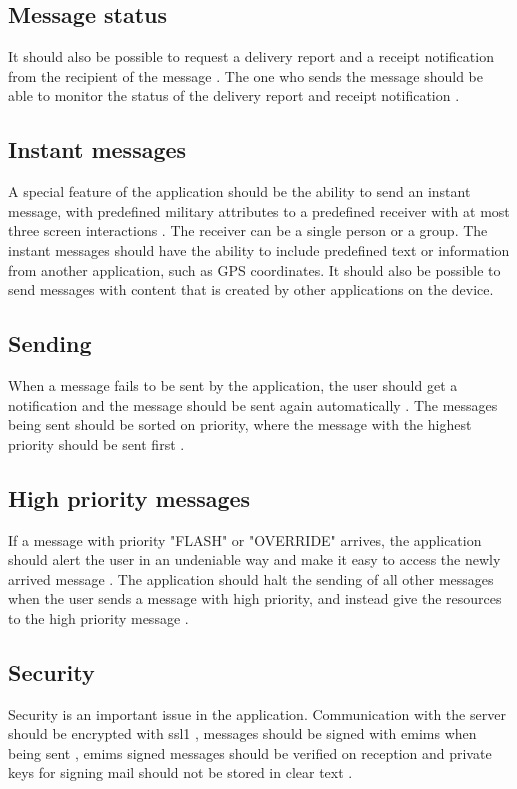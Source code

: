 \subsection{Message status}
It should also be possible to request a delivery report and a receipt notification from the recipient of the message . The one who sends the message should be able to monitor the status of the delivery report and receipt notification .

\subsection{Instant messages}
A special feature of the application should be the ability to send an instant message, with predefined military attributes to a predefined receiver with at most three screen interactions . The receiver can be a single person or a group. The instant messages should have the ability to include predefined text or information from another application, such as GPS coordinates. It should also be possible to send messages with content that is created by other applications on the device.

\subsection{Sending}
When a message fails to be sent by the application, the user should get a notification and the message should be sent again automatically . The messages being sent should be sorted on priority, where the message with the highest priority should be sent first .

\subsection{High priority messages}
If a message with priority "FLASH" or "OVERRIDE" arrives, the application should alert the user in an undeniable way and make it easy to access the newly arrived message . The application should halt the sending of all other messages when the user sends a message with high priority, and instead give the resources to the high priority message .

\subsection{Security}
Security is an important issue in the application. Communication with the server should be encrypted with \gls{ssl1} , messages should be signed with \gls{emims} when being sent , \gls{emims} signed messages should be verified on reception  and private keys for signing mail should not be stored in clear text .

